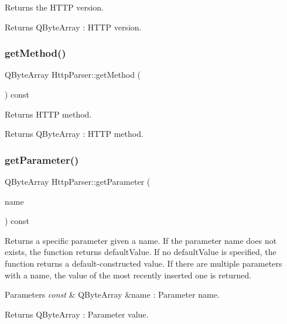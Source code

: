 Returns the H\+T\+TP version. 

\begin{DoxyReturn}{Returns}
Q\+Byte\+Array \+: H\+T\+TP version. 
\end{DoxyReturn}
\mbox{\label{class_http_parser_a283aa2b313491a592babdb5528086f71}} 
\subsubsection{\texorpdfstring{get\+Method()}{getMethod()}}
{\footnotesize\ttfamily Q\+Byte\+Array Http\+Parser\+::get\+Method (\begin{DoxyParamCaption}{ }\end{DoxyParamCaption}) const\hspace{0.3cm}{\ttfamily [inline]}}



Returns H\+T\+TP method. 

\begin{DoxyReturn}{Returns}
Q\+Byte\+Array \+: H\+T\+TP method. 
\end{DoxyReturn}
\mbox{\label{class_http_parser_a69fb981ff2f60058277c51b674006663}} 
\subsubsection{\texorpdfstring{get\+Parameter()}{getParameter()}}
{\footnotesize\ttfamily Q\+Byte\+Array Http\+Parser\+::get\+Parameter (\begin{DoxyParamCaption}\item[{const Q\+Byte\+Array \&}]{name }\end{DoxyParamCaption}) const\hspace{0.3cm}{\ttfamily [inline]}}



Returns a specific parameter given a name. If the parameter name does not exists, the function returns default\+Value. If no default\+Value is specified, the function returns a default-\/constructed value. If there are multiple parameters with a name, the value of the most recently inserted one is returned. 


\begin{DoxyParams}{Parameters}
{\em const} & Q\+Byte\+Array \&name \+: Parameter name. \\
\hline
\end{DoxyParams}
\begin{DoxyReturn}{Returns}
Q\+Byte\+Array \+: Parameter value. 
\end{DoxyReturn}
\mbox{\label{class_http_parser_ab0bb302010df956a954fada3061f59f0}} 
